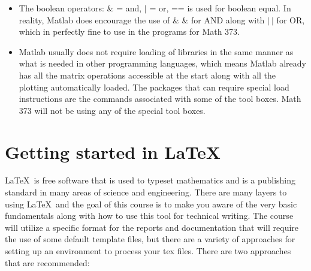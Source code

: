 \documentclass[twoside]{article}
\begin{document}
\begin{itemize}
\item The boolean operators: \& = and, $\vert$ = or, == is used for boolean equal. In reality, Matlab does encourage the use of  \&  \& for AND along with $\vert \ \vert $ for OR, which in perfectly fine to use in the programs for Math 373. 
\item Matlab usually does not require loading of libraries in the same manner as what is needed in other programming languages, which means Matlab already has all the matrix operations accessible at the start along with all the plotting automatically loaded. The packages that can require special load instructions are the commands associated with some of the tool boxes. Math 373 will not be using any of the special tool boxes. 
\end{itemize}

\section{Getting started in \LaTeX }
\LaTeX \ is free software that is used to typeset mathematics and is a publishing standard in many areas of science and engineering. There are many layers to using \LaTeX \ and the goal of this course is to make you aware of the very basic fundamentals along with how to use this tool for technical writing. The course will utilize a specific format for the reports and documentation that will require the use of some default template files, but there are a variety of approaches for setting up an environment to process your tex files. There are two approaches that are recommended:
\end{document}
